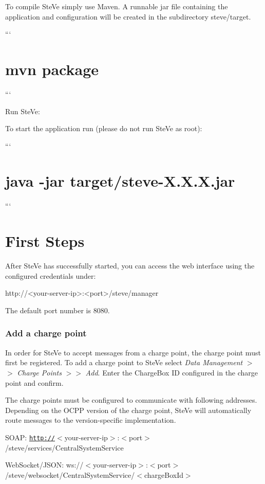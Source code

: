 \begin{DoxyEnumerate}
To compile Ste\-Ve simply use Maven. A runnable {\ttfamily jar} file containing the application and configuration will be created in the subdirectory {\ttfamily steve/target}.

``` \section*{mvn package}

```
\item Run Ste\-Ve\-:

To start the application run (please do not run Ste\-Ve as root)\-:

``` \section*{java -\/jar target/steve-\/\-X.\-X.\-X.\-jar}

```
\end{DoxyEnumerate}

\section*{First Steps}

After Ste\-Ve has successfully started, you can access the web interface using the configured credentials under\-: \begin{DoxyVerb}http://<your-server-ip>:<port>/steve/manager
\end{DoxyVerb}


The default port number is 8080.

\subsubsection*{Add a charge point}


\begin{DoxyEnumerate}
\item In order for Ste\-Ve to accept messages from a charge point, the charge point must first be registered. To add a charge point to Ste\-Ve select {\itshape Data Management} $>$$>$ {\itshape Charge Points} $>$$>$ {\itshape Add}. Enter the Charge\-Box I\-D configured in the charge point and confirm.
\item The charge points must be configured to communicate with following addresses. Depending on the O\-C\-P\-P version of the charge point, Ste\-Ve will automatically route messages to the version-\/specific implementation.
\begin{DoxyItemize}
\item S\-O\-A\-P\-: {\ttfamily \href{http://}{\tt http\-://}$<$your-\/server-\/ip$>$\-:$<$port$>$/steve/services/\-Central\-System\-Service}
\item Web\-Socket/\-J\-S\-O\-N\-: {\ttfamily ws\-://$<$your-\/server-\/ip$>$\-:$<$port$>$/steve/websocket/\-Central\-System\-Service/$<$charge\-Box\-Id$>$}
\end{DoxyItemize}
\end{DoxyEnumerate}

